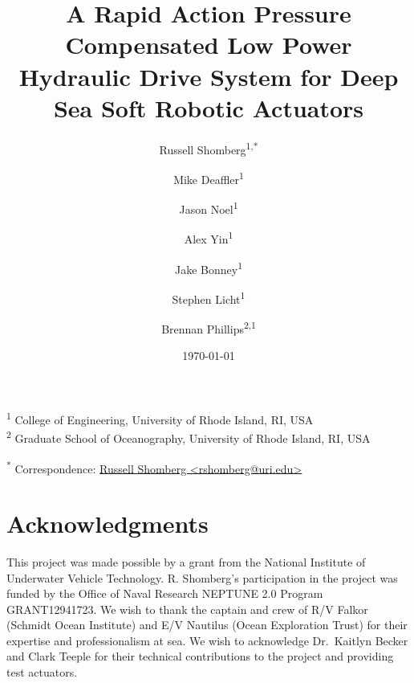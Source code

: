 \documentclass[
  10pt,
  draftcls,
  technote,
  letterpaper,
  oneside,
  onecolumn]{IEEEtran}
\title{A Rapid Action Pressure Compensated Low Power Hydraulic Drive System for Deep Sea Soft Robotic Actuators}
\author{Russell Shomberg\textsuperscript{1,*} \and Mike Deaffler\textsuperscript{1} \and Jason Noel\textsuperscript{1} \and Alex Yin\textsuperscript{1} \and Jake Bonney\textsuperscript{1} \and Stephen Licht\textsuperscript{1} \and Brennan Phillips\textsuperscript{2,1}}
\date{\today}
\begin{document}
\maketitle
\begin{abstract}

\end{abstract}

\textsuperscript{1} College of Engineering, University of Rhode Island,
RI, USA\\
\textsuperscript{2} Graduate School of Oceanography, University of Rhode
Island, RI, USA

\textsuperscript{*} Correspondence:
\href{mailto:rshomberg@uri.edu}{Russell Shomberg
\textless{}rshomberg@uri.edu\textgreater{}}



\hypertarget{acknowledgments}{%
\section{Acknowledgments}\label{acknowledgments}}

This project was made possible by a grant from 
the National Institute of Underwater Vehicle Technology.
R. Shomberg’s participation in the project was funded by the Office of
Naval Research NEPTUNE 2.0 Program GRANT12941723.
We wish to thank the captain and crew of R/V Falkor (Schmidt Ocean Institute) and E/V Nautilus (Ocean Exploration Trust) for their expertise and professionalism at sea.
We wish to acknowledge Dr.~Kaitlyn Becker and Clark Teeple for their technical contributions to the project and providing test actuators.


\printbibliography

\end{document}
